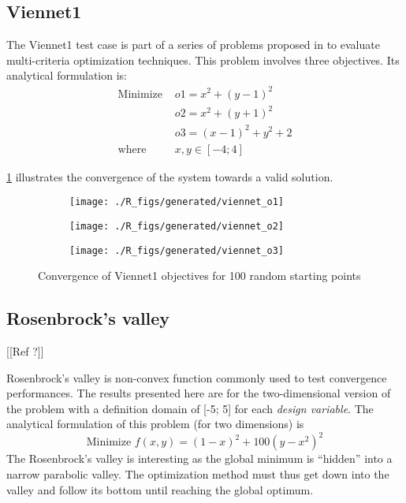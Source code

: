 \subsection{Viennet1}

The Viennet1 test case is part of a series of problems proposed in \cite{viennet1996multicriteria} to evaluate multi-criteria optimization techniques. This problem involves three objectives. Its analytical formulation is:
\begin{align*}
\text{Minimize } 	&o1 = x^2 + (y-1)^2 \\
								&o2 = x^2 + (y+1)^2 \\
								&o3 = (x-1)^2 + y^2 +2\\
\text{where } 		&x, y \in  [-4;4]						
\end{align*}				

\figurename \ref{viennet_res} illustrates the convergence of the system towards a valid solution.

\begin{figure}[h]

	\begin{subfigure}[b]{0.32\textwidth}
		\centering
		\texttt{[image: ./R\_figs/generated/viennet\_o1]}	
	\end{subfigure}
	\hfill%
	\begin{subfigure}[b]{0.32\textwidth}
		\centering
		\texttt{[image: ./R\_figs/generated/viennet\_o2]}	
	\end{subfigure}
	\hfill%
	\begin{subfigure}[b]{0.32\textwidth}
		\centering
		\texttt{[image: ./R\_figs/generated/viennet\_o3]}	
	\end{subfigure}
	\caption{Convergence of Viennet1 objectives for 100 random starting points}
	\label{viennet_res}
\end{figure}

\subsection{Rosenbrock's valley}

[[Ref ?]]

Rosenbrock's valley is non-convex function commonly used to test convergence performances. The results presented here are for the two-dimensional version of the problem with a definition domain of [-5; 5] for each \emph{design variable}.
The analytical formulation of this problem (for two dimensions) is 
$$\text{Minimize } f(x,y) = (1-x)^2 + 100(y - x^2)^2$$
The Rosenbrock's valley is interesting as the global minimum is \enquote{hidden} into a narrow parabolic valley. The optimization method must thus get down into the valley and follow its bottom until reaching the global optimum.

